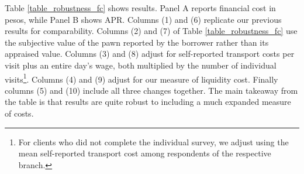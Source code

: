 \documentclass[oneside,11pt]{article}
\begin{document}
Table \ref{table_robustness_fc} shows results. Panel A reports financial cost in pesos, while Panel B shows APR. Columns (1) and (6) replicate our previous results for comparability. Columns (2) and (7) of Table \ref{table_robustness_fc} use the subjective value of the pawn reported by the borrower rather than its appraised value. Columns (3) and (8) adjust for self-reported transport costs per visit plus an entire day's wage, both multiplied by the number of individual visits\footnote{For clients who did not complete the individual survey, we adjust using the mean self-reported transport cost among respondents of the respective branch.}. Columns (4) and (9) adjust for our measure of liquidity cost. Finally columns (5) and (10) include all three changes together. The main takeaway from the table is that results are quite robust to including a much expanded measure of costs. 





\end{document}
